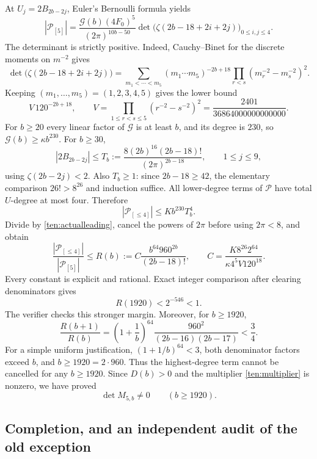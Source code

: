 \documentclass[11pt]{article}
\theoremstyle{definition}
\theoremstyle{remark}
\numberwithin{equation}{section}
\begin{document}
At $U_j=2B_{2b-2j}$, Euler's Bernoulli formula yields
\begin{equation}\label{ten:actualleading}
 |\mathscr P_{[5]}|
 =\frac{\mathscr G(b)(4F_0)^5}{(2\pi)^{10b-50}}
       \det\bigl(\zeta(2b-18+2i+2j)\bigr)_{0\le i,j\le4}.
\end{equation}
The determinant is strictly positive.  Indeed, Cauchy--Binet for
the discrete moments on $m^{-2}$ gives
\[
 \det\bigl(\zeta(2b-18+2i+2j)\bigr)
 =\sum_{m_1<\cdots<m_5}(m_1\cdots m_5)^{-2b+18}
                  \prod_{r<s}(m_r^{-2}-m_s^{-2})^2.
\]
Keeping $(m_1,\ldots,m_5)=(1,2,3,4,5)$ gives the lower bound
\[
 V\,120^{-2b+18},\qquad
 V=\prod_{1\le r<s\le5}(r^{-2}-s^{-2})^2
          =\frac{2401}{36864000000000000}.
\]
For $b\ge20$ every linear factor of $\mathscr G$ is at least $b$,
and its degree is $230$, so $\mathscr G(b)\ge\kappa b^{230}$.
For $b\ge30$,
\[
 |2B_{2b-2j}|\le
 T_b:=\frac{8(2b)^{16}(2b-18)!}{(2\pi)^{2b-18}},
 \qquad 1\le j\le9,
\]
using $\zeta(2b-2j)<2$.  Also $T_b\ge1$: since $2b-18\ge42$,
the elementary comparison $26!>8^{26}$ and induction suffice.
All lower-degree terms of $\mathscr P$ have total $U$-degree at
most four.  Therefore
\[
 |\mathscr P_{[\le4]}|\le Kb^{230}T_b^4.
\]
Divide by \eqref{ten:actualleading}, cancel the powers of $2\pi$
before using $2\pi<8$, and obtain
\begin{equation}\label{ten:bound}
 \frac{|\mathscr P_{[\le4]}|}{|\mathscr P_{[5]}|}
 \le R(b):=C\frac{b^{64}960^{2b}}{(2b-18)!},\qquad
 C=\frac{K8^{26}2^{64}}{\kappa4^5V120^{18}}.
\end{equation}
Every constant is explicit and rational.  Exact integer comparison
after clearing denominators gives
\[
 R(1920)<2^{-546}<1.
\]
The verifier checks this stronger margin.  Moreover, for $b\ge1920$,
\[
 \frac{R(b+1)}{R(b)}=
 \left(1+\frac1b\right)^{64}
      \frac{960^2}{(2b-16)(2b-17)}<\frac34.
\]
For a simple uniform justification, $(1+1/b)^{64}<3$,
both denominator factors exceed $b$, and $b\ge1920=2\cdot960$.
Thus the highest-degree term cannot be cancelled for any $b\ge1920$.
Since $D(b)>0$ and the multiplier \eqref{ten:multiplier} is nonzero,
we have proved
\begin{equation}\label{ten:eventual}
             \det M_{5,b}\ne0\qquad(b\ge1920).
\end{equation}

\subsection{Completion, and an independent audit of the old exception}
\end{document}

